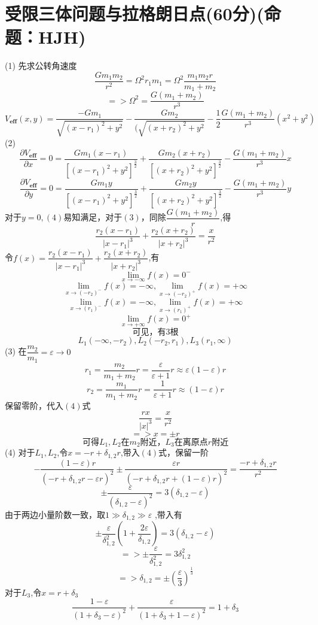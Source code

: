 \documentclass{article}
\begin{document}
\section*{受限三体问题与拉格朗日点(60分)(命题：HJH)}
\[\]
(1)
先求公转角速度
\[
\dfrac{Gm_1 m_2}{r^2}=\Omega^2 r_1 m_1=\Omega^2 \dfrac{m_1 m_2 r}{m_1 +m_2}
\]
\[
=>\Omega^2=\dfrac{G(m_1+m_2)}{r^3}\tag{1}
\]
\[
V_{\mathbf{eff}}(x,y)=
\dfrac{-Gm_1}{\sqrt{(x-r_1)^2+y^2}}
-\dfrac{Gm_2}{(\sqrt{(x+r_2)^2+y^2}}
-\dfrac{1}{2}\dfrac{G(m_1+m_2)}{r^3}(x^2+y^2)\tag{2}
\]
(2)
\[
\dfrac{\partial V_{\mathbf{eff}}}{\partial x}
=0
=\dfrac{Gm_1(x-r_1)}{[(x-r_1)^2+y^{2}]^{\frac{3}{2}}}
+\dfrac{Gm_2(x+r_2)}{[(x+r_2)^2+y^{2}]^{\frac{3}{2}}}
-\dfrac{G(m_1+m_2)}{r^3}x
\tag{3}
\]
\[
\dfrac{\partial V_{\mathbf{eff}}}{\partial y}=0
=\dfrac{Gm_1 y}{[(x-r_1)^2+y^{2}]^{\frac{3}{2}}}
+\dfrac{Gm_2 y}{[(x+r_2)^2+y^{2}]^{\frac{3}{2}}}
-\dfrac{G(m_1+m_2)}{r^3}y
\tag{4}
\]
对于$y=0,(4)$易知满足，对于$(3)$，同除$\dfrac{G(m_1+m_2)}{r}$,得
\[
 \dfrac{r_2(x-r_1)}{|x-r_1|^3}
+\dfrac{r_2(x+r_2)}{|x+r_2|^3}
=\dfrac{x}{r^2}\tag{3'}
\]
令$f(x)=\dfrac{r_2(x-r_1)}{|x-r_1|^3}+\dfrac{r_2(x+r_2)}{|x+r_2|^3}$,有
\[
\lim_{x \to -\infty}f(x)=0^-\tag{5}
\]
\[
\lim_{x \to (-r_2)^-}f(x)=-\infty,\lim_{x \to (-r_2)^+}f(x)=+\infty\tag{6}
\]
\[
\lim_{x \to (r_1)^-}f(x)=-\infty,\lim_{x \to (r_1)^+}f(x)=+\infty\tag{7}
\]
\[
\lim_{x \to +\infty}f(x)=0^+\tag{8}
\]
\[可见，有3根\tag{9}\]
\[L_1(-\infty,-r_2),L_2(-r_2,r_1),L_3(r_1,\infty)\tag{10}\]
(3)
在$\dfrac{m_2}{m_1}=\varepsilon\to 0$
\[
r_1=\dfrac{m_2}{m_1+m_2}r=\dfrac{\varepsilon}{\varepsilon+1}r\approx \varepsilon(1-\varepsilon)r\tag{11}
\]
\[
r_2=\dfrac{m_1}{m_1+m_2}r=\dfrac{1}{\varepsilon+1}r\approx (1-\varepsilon)r\tag{12}
\]
保留零阶，代入$(4)$式
\[
\dfrac{rx}{|x|^3}=\dfrac{x}{r^2}\tag{13}
\]
\[
=>x=\pm r\tag{14}
\]
\[
可得L_1,L_2在m_2附近，L_3在离原点r附近\tag{15}
\]
(4)
对于$L_1,L_2$,令$x=-r+\delta_{1,2}r$,带入$(4)$式，保留一阶
\[
-\dfrac{(1-\varepsilon)r}{(-r+\delta_{1,2}r-\varepsilon r)^2}
\pm 
\dfrac{\varepsilon r}{(-r + \delta_{1,2} r +(1-\varepsilon)r)^2}=\dfrac{-r+\delta_{1,2}r}{r^2}\tag{16}
\]
\[
\pm \dfrac{\varepsilon}{(\delta_{1,2}-\varepsilon)^2}=3(\delta_{1,2}-\varepsilon)
\]
由于两边小量阶数一致，取$1\gg\delta_{1,2}\gg\varepsilon$ ,带入有
\[
\pm \dfrac{\varepsilon}{\delta_{1,2}^2}\left(1+\dfrac{2\varepsilon}{\delta_{1,2}}\right)=3(\delta_{1,2}-\varepsilon)
\]
\[
=>\pm  \dfrac{\varepsilon}{\delta_{1,2}^2}=3 \delta_{1,2}^2
\]
\[
=>\delta_{1,2}= \pm \left(\dfrac{\varepsilon}{3}\right)^{\frac{1}{3}}\tag{17}
\]
对于$L_3$,令$x=r+\delta_3$
\[
\dfrac{1-\varepsilon}{(1+\delta_3-\varepsilon)^2}+\dfrac{\varepsilon}{(1+\delta_3+1-\varepsilon)^2}=1+\delta_3\tag{18}
\]
\end{document}
